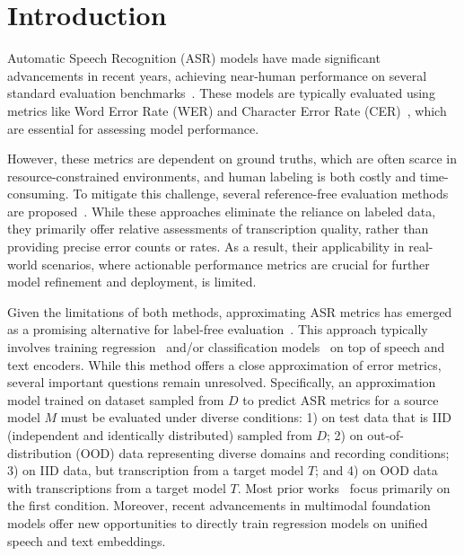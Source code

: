 \section{Introduction}

Automatic Speech Recognition (ASR) models have made significant advancements in recent years, achieving near-human performance on several standard evaluation benchmarks~\citep[\textit{inter alia}]{radford2022robustspeechrecognitionlargescale, seamless2023, communication2023seamlessm4tmassivelymultilingual, Harper_NeMo_a_toolkit}. These models are typically evaluated using metrics like Word Error Rate (WER) and Character Error Rate (CER)~\cite{likhomanenko2020rethinking}, which are essential for assessing model performance.

However, these metrics are dependent on ground truths, which are often scarce in resource-constrained environments, and human labeling is both costly and time-consuming. To mitigate this challenge, several reference-free evaluation methods are proposed~\cite{yuksel2023noreferreferencelessqualitymetric, 7178922, Swarup2019, 9413966, 8325512, 5947648}. While these approaches eliminate the reliance on labeled data, they primarily offer relative assessments of transcription quality, rather than providing precise error counts or rates. As a result, their applicability in real-world scenarios, where actionable performance metrics are crucial for further model refinement and deployment, is limited.

Given the limitations of both methods, approximating ASR metrics has emerged as a promising alternative for label-free evaluation~\cite{chowdhury2023multilingualworderrorrate, sheshadri2021werbertautomaticwerestimation, ali-renals-2018-word}. This approach typically involves training regression~\cite{jalalvand-etal-2016-transcrater} and/or classification models~\cite{sheshadri-etal-2021-wer} on top of speech and text encoders. While this method offers a close approximation of error metrics, several important questions remain unresolved. Specifically, an approximation model trained on dataset sampled from \(D\) to predict ASR metrics for a source model \(M\) must be evaluated under diverse conditions: 1) on test data that is IID (independent and identically distributed) sampled from \(D\); 2) on out-of-distribution (OOD) data representing diverse domains and recording conditions; 3) on IID data, but transcription from a target model \(T\); and 4) on OOD data with transcriptions from a target model \(T\). Most prior works~\cite{chowdhury2023multilingualworderrorrate, sheshadri2021werbertautomaticwerestimation} focus primarily on the first condition. Moreover, recent advancements in multimodal foundation models offer new opportunities to directly train regression models on unified speech and text embeddings.

